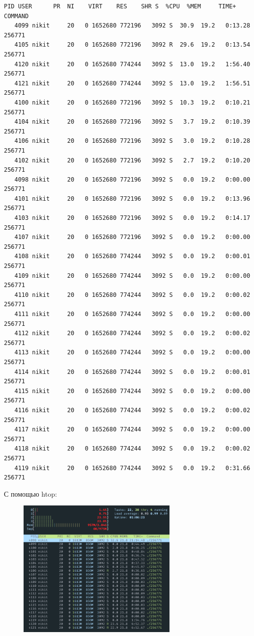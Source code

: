 \documentclass[11pt, a4paper]{article}
\begin{document}
\begin{Verbatim}[fontsize=\small]
    PID USER      PR  NI    VIRT    RES    SHR S  %CPU  %MEM     TIME+ COMMAND
   4099 nikit     20   0 1652680 772196   3092 S  30.9  19.2   0:13.28 256771
   4105 nikit     20   0 1652680 772196   3092 R  29.6  19.2   0:13.54 256771
   4120 nikit     20   0 1652680 774244   3092 S  13.0  19.2   1:56.40 256771
   4121 nikit     20   0 1652680 774244   3092 S  13.0  19.2   1:56.51 256771
   4100 nikit     20   0 1652680 772196   3092 S  10.3  19.2   0:10.21 256771
   4104 nikit     20   0 1652680 772196   3092 S   3.7  19.2   0:10.39 256771
   4106 nikit     20   0 1652680 772196   3092 S   3.0  19.2   0:10.28 256771
   4102 nikit     20   0 1652680 772196   3092 S   2.7  19.2   0:10.20 256771
   4098 nikit     20   0 1652680 772196   3092 S   0.0  19.2   0:00.00 256771
   4101 nikit     20   0 1652680 772196   3092 S   0.0  19.2   0:13.96 256771
   4103 nikit     20   0 1652680 772196   3092 S   0.0  19.2   0:14.17 256771
   4107 nikit     20   0 1652680 772196   3092 S   0.0  19.2   0:00.00 256771
   4108 nikit     20   0 1652680 774244   3092 S   0.0  19.2   0:00.01 256771
   4109 nikit     20   0 1652680 774244   3092 S   0.0  19.2   0:00.00 256771
   4110 nikit     20   0 1652680 774244   3092 S   0.0  19.2   0:00.02 256771
   4111 nikit     20   0 1652680 774244   3092 S   0.0  19.2   0:00.00 256771
   4112 nikit     20   0 1652680 774244   3092 S   0.0  19.2   0:00.02 256771
   4113 nikit     20   0 1652680 774244   3092 S   0.0  19.2   0:00.00 256771
   4114 nikit     20   0 1652680 774244   3092 S   0.0  19.2   0:00.01 256771
   4115 nikit     20   0 1652680 774244   3092 S   0.0  19.2   0:00.00 256771
   4116 nikit     20   0 1652680 774244   3092 S   0.0  19.2   0:00.02 256771
   4117 nikit     20   0 1652680 774244   3092 S   0.0  19.2   0:00.00 256771
   4118 nikit     20   0 1652680 774244   3092 S   0.0  19.2   0:00.02 256771
   4119 nikit     20   0 1652680 774244   3092 S   0.0  19.2   0:31.66 256771
\end{Verbatim}

\newpage
С помощью htop:

\begin{figure}[h]
  \centering
  \includegraphics[width=0.7\textwidth]{htop-1.png}
\end{figure}
\end{document}
